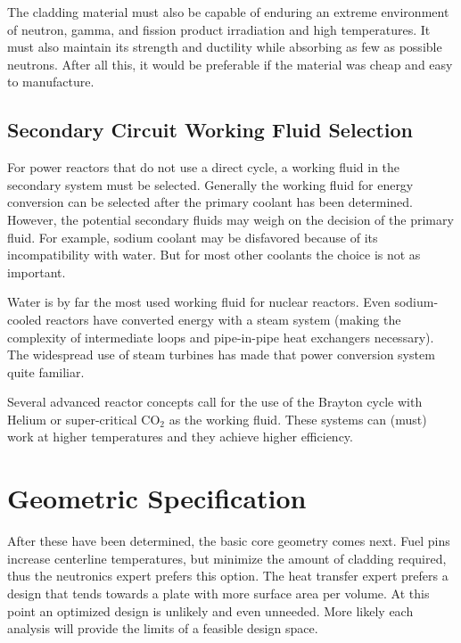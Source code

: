 The cladding material must also be capable of enduring an extreme environment of neutron, gamma, and fission product irradiation and high temperatures. It must also maintain its strength and ductility while absorbing as few as possible neutrons. 
After all this, it would be preferable if the material was cheap and easy to manufacture.

\subsection{Secondary Circuit Working Fluid Selection}
For power reactors that do not use a direct cycle, a working fluid in the secondary system must be selected. Generally the working fluid for energy conversion can be selected after the primary coolant has been determined. 
However, the potential secondary fluids may weigh on the decision of the primary fluid.
For example, sodium coolant may be disfavored because of its incompatibility with water. 
But for most other coolants the choice is not as important. 

Water is by far the most used working fluid for nuclear reactors. Even sodium-cooled reactors have converted energy with a steam system (making the complexity of intermediate loops and pipe-in-pipe heat exchangers necessary). 
The widespread use of steam turbines has made that power conversion system quite familiar.

Several advanced reactor concepts call for the use of the Brayton cycle with Helium or super-critical CO$_2$ as the working fluid. These systems can (must) work at higher temperatures and they achieve higher efficiency.


\section{Geometric Specification}
After these have been determined, the basic core geometry comes next. Fuel pins increase centerline temperatures, but minimize the amount of cladding required, thus the neutronics expert prefers this option. The heat transfer expert prefers a design that tends towards a plate with more surface area per volume. 
At this point an optimized design is unlikely and even unneeded. More likely each analysis will provide the limits of a feasible design space. 




